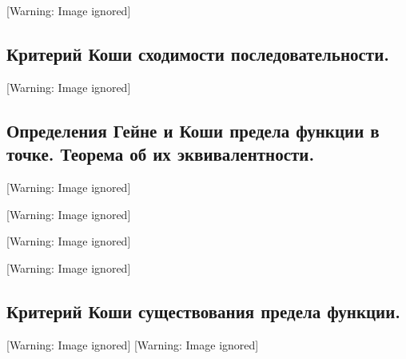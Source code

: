 \documentclass[a4paper]{article}
\begin{document}
  [Warning: Image ignored] %
 

\subsection{Критерий Коши сходимости последовательности.}
  [Warning: Image ignored] %
 

\subsection{Определения Гейне и Коши предела функции в точке. Теорема об их эквивалентности.}
  [Warning: Image ignored] %
 

  [Warning: Image ignored] %
 

  [Warning: Image ignored] %
 

  [Warning: Image ignored] %
 


\bigskip

\subsection{Критерий Коши существования предела функции.}
  [Warning: Image ignored] %
   [Warning: Image ignored] %
 
\end{document}
